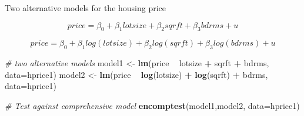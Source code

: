 \documentclass[]{book}
\newenvironment{Shaded}{\begin{snugshade}}{\end{snugshade}}
\newcommand{\CommentTok}[1]{\textcolor[rgb]{0.56,0.35,0.01}{\textit{#1}}}
\newcommand{\DataTypeTok}[1]{\textcolor[rgb]{0.13,0.29,0.53}{#1}}
\newcommand{\KeywordTok}[1]{\textcolor[rgb]{0.13,0.29,0.53}{\textbf{#1}}}
\newcommand{\NormalTok}[1]{#1}
\newcommand{\OperatorTok}[1]{\textcolor[rgb]{0.81,0.36,0.00}{\textbf{#1}}}
\newcommand{\StringTok}[1]{\textcolor[rgb]{0.31,0.60,0.02}{#1}}
\begin{document}
Two alternative models for the housing price

\begin{equation}
price = \beta_0 + \beta_1 lotsize  +\beta_2 sqrft  +\beta_3 bdrms  + u 
\end{equation}

\begin{equation}
price = \beta_0 + \beta_1 log(lotsize)  +\beta_2 log(sqrft)  +\beta_3 log(bdrms)  + u 
\end{equation}

\begin{Shaded}
\begin{Highlighting}[]
\CommentTok{# two alternative models}
\NormalTok{model1 <-}\StringTok{ }\KeywordTok{lm}\NormalTok{(price }\OperatorTok{~}\StringTok{     }\NormalTok{lotsize  }\OperatorTok{+}\StringTok{     }\NormalTok{sqrft  }\OperatorTok{+}\StringTok{ }\NormalTok{bdrms, }\DataTypeTok{data=}\NormalTok{hprice1)}
\NormalTok{model2 <-}\StringTok{ }\KeywordTok{lm}\NormalTok{(price }\OperatorTok{~}\StringTok{ }\KeywordTok{log}\NormalTok{(lotsize) }\OperatorTok{+}\StringTok{ }\KeywordTok{log}\NormalTok{(sqrft) }\OperatorTok{+}\StringTok{ }\NormalTok{bdrms, }\DataTypeTok{data=}\NormalTok{hprice1)}

\CommentTok{# Test against comprehensive model}
\KeywordTok{encomptest}\NormalTok{(model1,model2, }\DataTypeTok{data=}\NormalTok{hprice1)}
\end{Highlighting}
\end{Shaded}

 
  \providecommand{\huxb}[2]{\arrayrulecolor[RGB]{#1}\global\arrayrulewidth=#2pt}
  \providecommand{\huxvb}[2]{\color[RGB]{#1}\vrule width #2pt}
  \providecommand{\huxtpad}[1]{\rule{0pt}{\baselineskip+#1}}
  \providecommand{\huxbpad}[1]{\rule[-#1]{0pt}{#1}}
\end{document}
